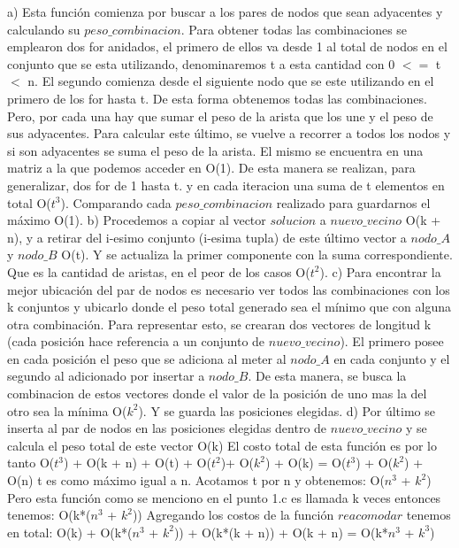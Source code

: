 \documentclass[a4paper]{article}
\begin{document}
a) Esta funci\'on comienza por buscar a los pares de nodos que sean adyacentes y calculando su $peso\_combinacion$. Para obtener todas las combinaciones se emplearon dos for anidados, el primero de ellos va desde 1 al total de nodos en el conjunto que se esta utilizando, denominaremos t a esta cantidad con 0 $<=$ t $<$ n. El segundo comienza desde el siguiente nodo que se este utilizando en el primero de los for hasta t. De esta forma obtenemos todas las combinaciones. Pero, por cada una hay que sumar el peso de la arista que los une y el peso de sus adyacentes. Para calcular este \'ultimo, se vuelve a recorrer a todos los nodos y si son adyacentes se suma el peso de la arista. El mismo se encuentra en una matriz a la que podemos acceder en O(1). De esta manera se realizan, para generalizar, dos for de 1 hasta t. y en cada iteracion una suma de t elementos en total O($t^{3}$).
Comparando cada $peso\_combinacion$ realizado para guardarnos el m\'aximo O(1). \newline
b) Procedemos a copiar al vector $solucion$ a $nuevo\_vecino$ O(k + n), y a retirar del i-esimo conjunto (i-esima tupla) de este \'ultimo vector a $nodo\_A$ y $nodo\_B$ O(t).  Y se actualiza la primer componente con la suma correspondiente. Que es la cantidad de aristas, en el peor de los casos O($t^{2}$).  \newline
c) Para encontrar la mejor ubicaci\'on del par de nodos es necesario ver todos las combinaciones con los k conjuntos y ubicarlo donde el peso total generado sea el m\'inimo que con alguna otra combinaci\'on. Para representar esto, se crearan dos vectores de longitud k (cada posici\'on  hace referencia a un conjunto de $nuevo\_vecino$). El primero posee en cada posici\'on el peso que se adiciona al meter al $nodo\_A$ en cada conjunto y el segundo al adicionado por insertar a $nodo\_B$. De esta manera, se busca la combinacion de estos vectores donde el valor de la posici\'on de uno mas la del otro sea la m\'inima O($k^{2}$). Y se guarda las posiciones elegidas. \newline
d) Por \'ultimo se inserta al par de nodos en las posiciones elegidas dentro de $nuevo\_vecino$ y se calcula el peso total de este vector O(k)\newline \newline
El costo total de esta funci\'on es por lo tanto O($t^{3}$) + O(k + n) + O(t) + O($t^{2}$)+ O($k^{2}$) + O(k) = O($t^{3}$) + O($k^{2}$) + O(n) \newline t es como m\'aximo igual a n. Acotamos t por n y obtenemos: \newline O($n^{3}$ + $k^{2}$) \newline
Pero esta funci\'on como se menciono en el punto 1.c es llamada k veces entonces tenemos: \newline O(k*($n^{3}$ + $k^{2}$)) \newline
Agregando los costos de la funci\'on $reacomodar$ tenemos en total: \newline 
O(k) + O(k*($n^{3}$ + $k^{2}$)) + O(k*(k + n)) + O(k + n) = O(k*$n^{3}$ + $k^{3}$) 
\end{document}
